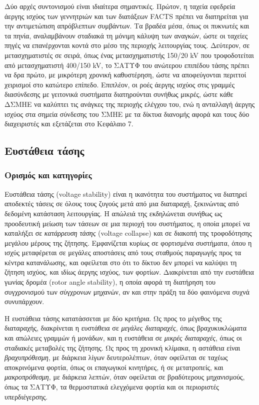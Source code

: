 Δύο αρχές συντονισμού είναι ιδιαίτερα σημαντικές. Πρώτον, η ταχεία εφεδρεία άεργης ισχύος των
γεννητριών και των διατάξεων FACTS πρέπει να διατηρείται για την αντιμετώπιση απρόβλεπτων
συμβάντων. Τα βραδέα μέσα, όπως οι πυκνωτές και τα πηνία, αναλαμβάνουν σταδιακά τη μόνιμη
κάλυψη των αναγκών, ώστε οι ταχείες πηγές να επανέρχονται κοντά στο μέσο της περιοχής
λειτουργίας τους. Δεύτερον, σε μετασχηματιστές σε σειρά, όπως ένας μετασχηματιστής 150/20 kV
που τροφοδοτείται από μετασχηματιστή 400/150 kV, το ΣΑΤΥΦ του ανώτερου επιπέδου τάσης πρέπει
να δρα πρώτο, με μικρότερη χρονική καθυστέρηση, ώστε να αποφεύγονται περιττοί χειρισμοί στο
κατώτερο επίπεδο. Επιπλέον, οι ροές άεργης ισχύος στις γραμμές διασύνδεσης με γειτονικά
συστήματα διατηρούνται συνήθως μικρές, ώστε κάθε ΔΣΜΗΕ να καλύπτει τις ανάγκες της περιοχής
ελέγχου του, ενώ η ανταλλαγή άεργης ισχύος στα σημεία σύνδεσης του ΣΜΗΕ με τα
δίκτυα διανομής αφορά και τους δύο διαχειριστές και εξετάζεται στο Κεφάλαιο 7.

\subsection{Ευστάθεια τάσης}
\label{sec:v-stability}

\subsubsection{Ορισμός και κατηγορίες}

Ευστάθεια τάσης (voltage stability) είναι η ικανότητα του συστήματος να διατηρεί αποδεκτές
τάσεις σε όλους τους ζυγούς μετά από μια διαταραχή, ξεκινώντας από δεδομένη κατάσταση
λειτουργίας. Η απώλειά της εκδηλώνεται συνήθως ως προοδευτική μείωση των τάσεων σε μια περιοχή
του συστήματος, η οποία μπορεί να καταλήξει σε \emph{κατάρρευση τάσης} (voltage collapse) και
σε διακοπή της τροφοδότησης μεγάλου μέρους της ζήτησης. Εμφανίζεται κυρίως σε φορτισμένα
συστήματα, όπου η ισχύς μεταφέρεται σε μεγάλες αποστάσεις από τους σταθμούς παραγωγής προς τα
κέντρα κατανάλωσης, και οφείλεται στο ότι το δίκτυο δεν μπορεί να καλύψει τη ζήτηση ισχύος, και
ιδίως άεργης ισχύος, των φορτίων. Διακρίνεται από την ευστάθεια γωνίας δρομέα (rotor angle
stability), η οποία αφορά τη
διατήρηση του συγχρονισμού των σύγχρονων μηχανών, αν και στην πράξη τα δύο φαινόμενα συχνά
συνυπάρχουν.

Η ευστάθεια τάσης κατατάσσεται με δύο κριτήρια. Ως προς το μέγεθος της διαταραχής, διακρίνεται
η ευστάθεια σε \emph{μεγάλες διαταραχές}, όπως βραχυκυκλώματα και απώλειες γραμμών ή μονάδων,
και η ευστάθεια σε \emph{μικρές διαταραχές}, όπως οι σταδιακές μεταβολές της ζήτησης. Ως προς
τη χρονική κλίμακα, η αστάθεια είναι \emph{βραχυπρόθεσμη}, με διάρκεια λίγων δευτερολέπτων,
όταν οφείλεται σε ταχέως αποκρινόμενα φορτία, όπως οι επαγωγικοί κινητήρες, ή σε μετατροπείς,
και \emph{μακροπρόθεσμη}, με διάρκεια λεπτών, όταν οφείλεται σε βραδύτερους μηχανισμούς, όπως
τα ΣΑΤΥΦ, τα θερμοστατικά ελεγχόμενα φορτία και οι περιοριστές υπερδιέγερσης.

